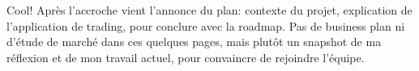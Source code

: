 Cool! Après l'accroche vient l'annonce du plan: contexte du projet,
explication de l'application de trading, pour conclure avec la roadmap.\newline
Pas de business plan ni d'étude de marché dans ces quelques pages, mais
plutôt un snapshot de ma réflexion et de mon travail actuel, pour
convaincre de rejoindre l'équipe.
